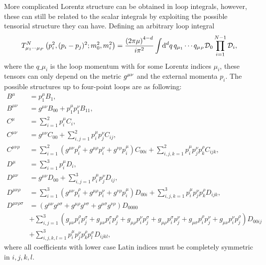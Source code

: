 \documentclass[../main.tex]{subfiles}
\begin{document}
More complicated Lorentz structure can be obtained in loop integrals, however,
these can still be related to the scalar integrals by exploiting the possible
tensorial structure they can have. Defining an arbitrary loop integral
\begin{equation}
  T^N_{\mu_1\cdots\mu_P}\left(p_i^2, (p_i-p_j)^2; m_0^2, m_i^2\right) =
  \frac{\left(2\pi \mu\right)^{4-d}}{i \pi^2} \int \!\mathrm{d}^d q\, q_{\mu_1}\cdots
  q_{\mu_P} \mathcal{D}_0 \prod_{i=1}^{N-1} \mathcal{D}_i,
\end{equation}
where the \(q\_{\mu_i}\) is the loop momentum with for some Lorentz indices \(\mu_i\),
these tensors can only depend on the metric \(\tensor{g}{^\mu^\nu}\) and the
external momenta \(p_i\).
The possible structures up to four-point loops are as following:
\begin{subequations}
  \begin{align}
    B^\mu                & = p_1^\mu B_1,
    \\
    B^{\mu\nu}           & = g^{\mu\nu} B_{00} + p_1^\mu p_1^\nu B_{11},
    \\
    C^\mu                & = \sum_{i=1}^2 p_i^\mu C_i,
    \\
    C^{\mu\nu}           & = g^{\mu\nu} C_{00} + \sum_{i,j=1}^{2} p_i^\mu
    p_j^\nu C_{ij},
    \\
    C^{\mu\nu\rho}       & = \sum_{i=1}^2 (g^{\mu\nu} p_i^{\rho} +
    g^{\mu\rho} p_i^{\nu} + g^{\nu\rho} p_i^{\mu}) C_{00i} +
    \sum_{i,j,k=1}^2
    p_i^\mu p_j^\nu p_k^\rho C_{ijk},
    \\
    D^\mu                & = \sum_{i=1}^3 p_i^\mu D_i,
    \\
    D^{\mu\nu}           & = g^{\mu\nu} D_{00} + \sum_{i,j=1}^{3} p_i^\mu
    p_j^\nu D_{ij},
    \\
    D^{\mu\nu\rho}       & = \sum_{i=1}^3 (g^{\mu\nu} p_i^{\rho} +
    g^{\mu\rho} p_i^{\nu} + g^{\nu\rho} p_i^{\mu}) D_{00i} +
    \sum_{i,j,k=1}^3
    p_i^\mu p_j^\nu p_k^\rho D_{ijk},
    \\
    \nonumber
    D^{\mu\nu\rho\sigma} & = (g^{\mu\nu}g^{\rho\sigma} +
    g^{\mu\rho}g^{\nu\sigma} + g^{\mu\sigma}g^{\nu\rho})D_{0000}
    \\
    \nonumber
                         & + \sum_{i,j=1}^3 (g_{\mu\nu}p_i^\rho p_j^\sigma
    + g_{\mu\nu}p_i^\sigma p_j^\rho + g_{\mu\rho}p_i^\nu p_j^\sigma +
    g_{\mu\rho}p_i^\sigma p_j^\nu + g_{\mu\sigma}p_i^\rho p_j^\nu +
    g_{\mu\nu}p_i^\nu p_j^\rho) D_{00ij}
    \\
                         & + \sum_{i,j,k,l=1}^3 p_i^\mu p_j^\nu p_k^\rho
    p_l^\sigma D_{ijkl},
  \end{align}
\end{subequations}
where all coefficients with lower case Latin indices must be completely symmetric in \(i,j,k,l\).


\ifSubfilesClassLoaded{%
  {}
  
}{}
\end{document}
